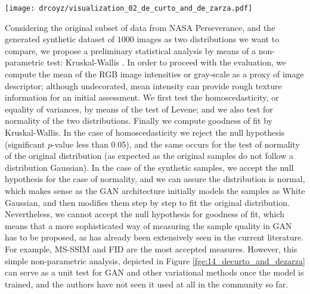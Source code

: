 \documentclass[lettersize,journal]{IEEEtran}
\begin{document}
\begin{figure*}[ht]
\centering
\texttt{[image: drcoyz/visualization\_02\_de\_curto\_and\_de\_zarza.pdf]}
\caption{Statistical measures to study goodness of fit to initially assess GAN convergence.}
\label{fge:14_decurto_and_dezarza}
\end{figure*}

Considering the original subset of data from NASA Perseverance, and the generated synthetic dataset of $1000$ images as two distributions we want to compare, we propose a preliminary statistical analysis by means of a non-parametric test: Kruskal-Wallis \cite{KruskalandWallis52}. In order to proceed with the evaluation, we compute the mean of the RGB image intensities or gray-scale as a proxy of image descriptor; although undecorated, mean intensity can provide rough texture information for an initial assessment. We first test the homoscedasticity, or equality of variances, by means of the test of Levene; and we also test for normality of the two distributions. Finally we compute goodness of fit by Kruskal-Wallis. In the case of homoscedasticity we reject the null hypothesis (significant $p$-value less than 0.05), and the same occurs for the test of normality of the original distribution (as expected as the original samples do not follow a distribution Gaussian). In the case of the synthetic samples, we accept the null hypothesis for the case of normality, and we can assure the distribution is normal, which makes sense as the GAN architecture initially models the samples as White Gaussian, and then modifies them step by step to fit the original distribution. Nevertheless, we cannot accept the null hypothesis for goodness of fit, which means that a more sophisticated way of measuring the sample quality in GAN has to be proposed, as has already been extensively seen in the current literature. For example, MS-SSIM \cite{Odena17} and FID \cite{Heusel17} are the most accepted measures. However, this simple non-parametric analysis, depicted in Figure \ref{fge:14_decurto_and_dezarza} can serve as a unit test for GAN and other variational methods once the model is trained, and the authors have not seen it used at all in the community so far.
\end{document}

